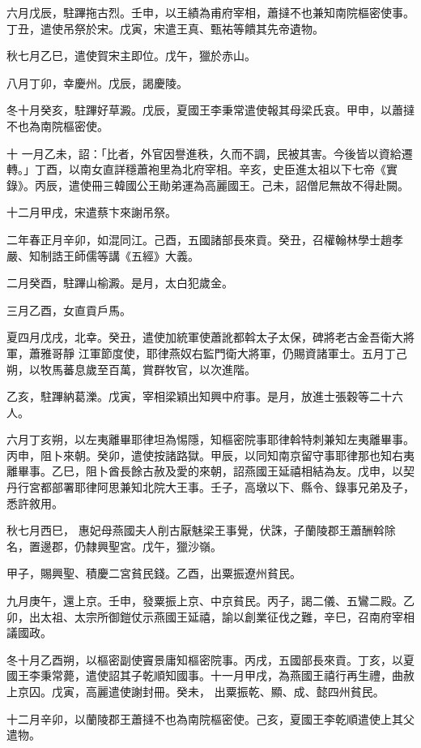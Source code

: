 \begin{pinyinscope}
 六月戊辰，駐蹕拖古烈。壬申，以王績為甫府宰相，蕭撻不也兼知南院樞密使事。丁丑，遣使吊祭於宋。戊寅，宋遣王真、甄祐等饋其先帝遺物。



 秋七月乙巳，遣使賀宋主即位。戊午，獵於赤山。



 八月丁卯，幸慶州。戊辰，謁慶陵。



 冬十月癸亥，駐蹕好草澱。戊辰，夏國王李秉常遣使報其母梁氏哀。甲申，以蕭撻不也為南院樞密使。



 十
 一月乙未，詔：「比者，外官因譽進秩，久而不調，民被其害。今後皆以資給遷轉。」丁酉，以南女直詳穩蕭袍里為北府宰相。辛亥，史臣進太祖以下七帝《實錄》。丙辰，遣使冊三韓國公王勛弟運為高麗國王。己未，詔僧尼無故不得赴闕。



 十二月甲戌，宋遣蔡卞來謝吊祭。



 二年春正月辛卯，如混同江。己酉，五國諸部長來貢。癸丑，召權翰林學士趙孝嚴、知制誥王師儒等講《五經》大義。



 二月癸酉，駐蹕山榆澱。是月，太白犯歲金。



 三月乙酉，女直貢戶馬。



 夏四月戊戌，北幸。癸丑，遣使加統軍使蕭訛都斡太子太保，碑將老古金吾衛大將軍，蕭雅哥靜
 江軍節度使，耶律燕奴右監門衛大將軍，仍賜資諸軍士。五月丁己朔，以牧馬蕃息歲至百萬，賞群牧官，以次進階。



 乙亥，駐蹕納葛濼。戊寅，宰相梁穎出知興中府事。是月，放進士張穀等二十六人。



 六月丁亥朔，以左夷離畢耶律坦為惕隱，知樞密院事耶律斡特刺兼知左夷離畢事。丙申，阻卜來朝。癸卯，遣使按諸路獄。甲辰，以同知南京留守事耶律那也知右夷離畢事。乙巳，阻卜酋長餘古赦及愛的來朝，詔燕國王延禧相結為友。戊申，以契丹行宮都部署耶律阿思兼知北院大王事。壬子，高墩以下、縣令、錄事兄弟及子，悉許敘用。



 秋七月西巳，
 惠妃母燕國夫人削古厭魅梁王事覺，伏誅，子蘭陵郡王蕭酬斡除名，置邊郡，仍隸興聖宮。戊午，獵沙嶺。



 甲子，賜興聖、積慶二宮貧民錢。乙酉，出粟振遼州貧民。



 九月庚午，還上京。壬申，發粟振上京、中京貧民。丙子，謁二儀、五鸞二殿。乙卯，出太祖、太宗所御鎧仗示燕國王延禧，諭以創業征伐之難，辛巳，召南府宰相議國政。



 冬十月乙酉朔，以樞密副使竇景庸知樞密院事。丙戌，五國部長來貢。丁亥，以夏國王李秉常薨，遣使詔其子乾順知國事。十一月甲戌，為燕國王禧行再生禮，曲赦上京囚。戊寅，高麗遣使謝封冊。癸未，
 出粟振乾、顯、成、懿四州貧民。



 十二月辛卯，以蘭陵郡王蕭撻不也為南院樞密使。己亥，夏國王李乾順遣使上其父遣物。



\end{pinyinscope}